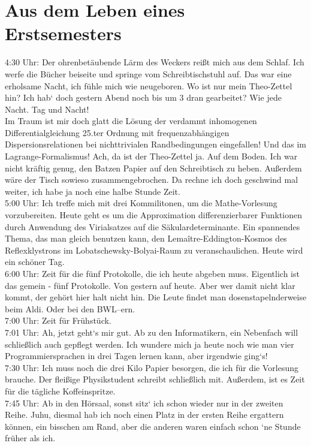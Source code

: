 \section{Aus dem Leben eines Erstsemesters}
\label{sec:erstsemester_leben}
4:30 Uhr: Der ohrenbetäubende Lärm des Weckers rei\ss t mich aus dem Schlaf. Ich werfe die Bücher beiseite und springe vom Schreibtischstuhl auf. Das war eine erholsame Nacht, ich fühle mich wie neugeboren. Wo ist nur mein Theo-Zettel hin? Ich hab` doch gestern Abend noch bis um 3 dran gearbeitet? Wie jede Nacht. Tag und Nacht!\\
Im Traum ist mir doch glatt die Lösung der verdammt inhomogenen Differentialgleichung 25.ter Ordnung mit frequenzabhängigen Dispersionsrelationen bei nichttrivialen Randbedingungen eingefallen! Und das im Lagrange-Formalismus! Ach, da ist der Theo-Zettel ja. Auf dem Boden. Ich war nicht kräftig genug, den Batzen Papier auf den Schreibtisch zu heben. Au\ss erdem wäre der Tisch sowieso zusammengebrochen. Da rechne ich doch geschwind mal weiter, ich habe ja noch eine halbe Stunde Zeit.\\
5:00 Uhr: Ich treffe mich mit drei Kommilitonen, um die Mathe-Vorlesung vorzubereiten. Heute geht es um die Approximation differenzierbarer Funktionen durch Anwendung des Virialsatzes auf die Säkulardeterminante. Ein spannendes Thema, das man gleich benutzen kann, den Lemaître-Eddington-Kosmos des Reflexklystrons im Lobatschewsky-Bolyai-Raum zu veranschaulichen. Heute wird ein schöner Tag.\\
6:00 Uhr: Zeit für die fünf Protokolle, die ich heute abgeben muss. Eigentlich ist das gemein - fünf Protokolle. Von gestern auf heute. Aber wer damit nicht klar kommt, der gehört hier halt nicht hin. Die Leute findet man dosenstapelnderweise beim Aldi. Oder bei den BWL--ern.\\
7:00 Uhr: Zeit für Frühstück.\\
7:01 Uhr: Ah, jetzt geht`s mir gut. Ab zu den Informatikern, ein Nebenfach will schlie\ss lich auch gepflegt werden. Ich wundere mich ja heute noch wie man vier Programmiersprachen in drei Tagen lernen kann, aber irgendwie ging`s!\\
7:30 Uhr: Ich muss noch die drei Kilo Papier besorgen, die ich für die Vorlesung brauche. Der flei\ss ige Physikstudent schreibt schlie\ss lich mit. Au\ss erdem, ist es Zeit für die tägliche Koffeinspritze.\\
7:45 Uhr: Ab in den Hörsaal, sonst sitz` ich schon wieder nur in der zweiten Reihe. Juhu, diesmal hab ich noch einen Platz in der ersten Reihe ergattern können, ein bisschen am Rand, aber die anderen waren einfach schon `ne Stunde früher als ich.\\
